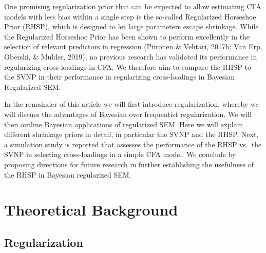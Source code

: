 \documentclass[
  man, donotrepeattitle,floatsintext]{apa6}
\begin{document}
One promising regularization prior that can be expected to allow estimating CFA models with less bias within a single step is the so-called Regularized Horseshoe Prior (RHSP), which is designed to let large parameters escape shrinkage. While the Regularized Horseshoe Prior has been shown to perform excellently in the selection of relevant predictors in regression (Piironen \& Vehtari, 2017b; Van Erp, Oberski, \& Mulder, 2019), no previous research has validated its performance in regularizing cross-loadings in CFA. We therefore aim to compare the RHSP to the SVNP in their performance in regularizing cross-loadings in Bayesian Regularized SEM.

In the remainder of this article we will first introduce regularization, whereby we will discuss the advantages of Bayesian over frequentist regularization. We will then outline Bayesian applications of regularized SEM. Here we will explain different shrinkage priors in detail, in particular the SVNP and the RHSP. Next, a simulation study is reported that assesses the performance of the RHSP vs.~the SVNP in selecting cross-loadings in a simple CFA model. We conclude by proposing directions for future research in further establishing the usefulness of the RHSP in Bayesian regularized SEM.

\hypertarget{theoretical-background}{%
\section{Theoretical Background}\label{theoretical-background}}

\hypertarget{regularization}{%
\subsection{Regularization}\label{regularization}}
\end{document}
